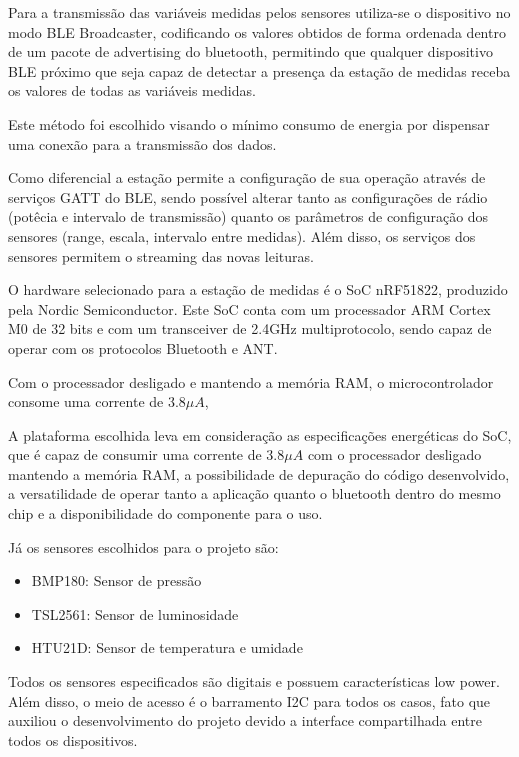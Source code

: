 Para a transmissão das variáveis medidas pelos sensores utiliza-se o dispositivo
no modo BLE Broadcaster, codificando os valores obtidos de forma ordenada dentro
de um pacote de advertising do bluetooth, permitindo que qualquer dispositivo
BLE próximo que seja capaz de detectar a presença da estação de medidas
receba os valores de todas as variáveis medidas.

Este método foi escolhido visando o mínimo consumo de energia por dispensar uma
conexão para a transmissão dos dados.
 
Como diferencial a estação permite a configuração de sua operação através de
serviços GATT do BLE, sendo possível alterar tanto as configurações de rádio
(potêcia e intervalo de transmissão) quanto os parâmetros de configuração dos
sensores (range, escala, intervalo entre medidas). Além disso, os serviços dos
sensores permitem o streaming das novas leituras.



O hardware selecionado para a estação de medidas é o SoC nRF51822, produzido
pela Nordic Semiconductor. Este SoC conta com um processador ARM Cortex M0 de 32
bits e com um transceiver de 2.4GHz multiprotocolo, sendo capaz de operar com
os protocolos Bluetooth e ANT.\cite{nRF51ProdSpec}

Com o processador desligado e mantendo a memória RAM, o microcontrolador consome
uma corrente de 3.8$\mu A$,

A plataforma escolhida leva em consideração as especificações energéticas do
SoC, que é capaz de consumir uma corrente de 3.8$\mu A$ com o processador
desligado mantendo a memória RAM\cite{nRF51ProdSpec}, a possibilidade de
depuração do código desenvolvido, a versatilidade de operar tanto a aplicação
quanto o bluetooth dentro do mesmo chip e a disponibilidade do componente para o uso.

Já os sensores escolhidos para o projeto são:
\begin{itemize} 
  \item BMP180: Sensor de pressão
  \item TSL2561: Sensor de luminosidade
  \item HTU21D: Sensor de temperatura e umidade
\end{itemize}

Todos os sensores especificados são digitais e possuem características low
power. Além disso, o meio de acesso é o barramento I2C para todos os casos, fato
que auxiliou o desenvolvimento do projeto devido a interface compartilhada entre
todos os dispositivos.

